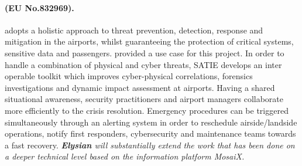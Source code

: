 \documentclass[a4paper,11pt]{article}
\newcommand{\project}[1]{\textbf{#1}\xspace}
\newcommand{\SECURITY}{\project{Elysian}}
\newcommand{\TheProject}{\SECURITY}
\begin{document}

\begin{mdframed}[backgroundcolor=blue!5]
\paragraph{\satie (EU No.832969).}
\satie adopts a holistic approach to threat prevention, detection, response and mitigation in the airports, whilst guaranteeing the protection of critical systems, sensitive data and passengers. \FRQshort{} provided a use case for this project.  In order to handle a combination of physical and cyber threats, SATIE develops an inter operable toolkit which improves cyber-physical correlations, forensics investigations and dynamic impact assessment at airports. Having a shared situational awareness, security practitioners and airport managers collaborate more efficiently to the crisis resolution. Emergency procedures can be triggered simultaneously through an alerting system in order to reschedule airside/landside operations, notify first responders, cybersecurity and maintenance teams towards a fast recovery.
\emph{\TheProject will substantially extend the work that has been done on a deeper technical level based on the information platform MosaiX.}
\end{mdframed}
\end{document}
